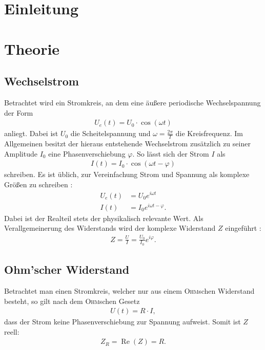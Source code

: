 \documentclass[12pt,a4paper,titlepage,headinclude]{scrartcl}
\newcommand{\person}[1]{\textsc{#1}}
\begin{document}
\cleardoublepage
\tableofcontents
\thispagestyle{empty}
\cleardoublepage

\setcounter{footnote}{0}
\setcounter{page}{1}


\newpage

\section{Einleitung}
\label{sec:einleitung}

\section{Theorie}
\subsection{Wechselstrom}
\label{sec:theorie}
Betrachtet wird ein Stromkreis, an dem eine äußere periodische Wechselspannung der Form
\begin{align}
	U_e(t)=U_0\cdot\cos(\omega t)
	\label{eq:wechselspannung}
\end{align}
anliegt. Dabei ist $U_0$ die Scheitelspannung und $\omega=\frac{2\pi}{T}$ die Kreisfrequenz. Im Allgemeinen besitzt der hieraus entstehende Wechselstrom zusätzlich zu seiner Amplitude $I_0$ eine Phasenverschiebung $\varphi$. So lässt sich der Strom $I$ als
\begin{align}
	I(t)=I_0\cdot\cos(\omega t-\varphi)
	\label{eq:wechselstrom}
\end{align}
schreiben. Es ist üblich, zur Vereinfachung Strom und Spannung als komplexe Größen zu schreiben \cite[253]{nol3}:
\begin{align}
	U_e(t)&=U_0e^{i\omega t}
	\label{eq:complexspannung}\\
	I(t)&=I_0e^{i\omega t-\varphi}.
	\label{eq:complexstrom}
\end{align}
Dabei ist der Realteil stets der physikalisch relevante Wert.
Als Verallgemeinerung des Widerstands wird der komplexe Widerstand $Z$ eingeführt \cite[254]{nol3}:
\begin{align}
	Z=\frac{U}{I}=\frac{U_0}{I_0}e^{i\varphi}.
	\label{eq:z}
\end{align}
\subsection{Ohm'scher Widerstand}
Betrachtet man einen Stromkreis, welcher nur aus einem \person{Ohm}schen Widerstand besteht, so gilt nach dem \person{Ohm}schen Gesetz
\begin{align}
	U(t)=R\cdot I,
	\label{eq:ohm}
\end{align}
dass der Strom keine Phasenverschiebung zur Spannung aufweist. Somit ist $Z$ reell:
\begin{align}
	Z_{R}=\operatorname{Re}(Z)=R.
	\label{eq:zR}
\end{align}
\end{document}
